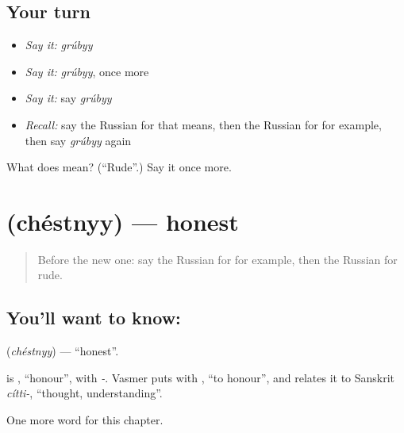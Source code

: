 \subsection*{Your turn}
\begin{itemize}
\raggedright
  \item \emph{Say it:} \emph{grúbyy}
  \item \emph{Say it:} \emph{grúbyy}, once more
  \item \emph{Say it:} say \emph{grúbyy}
  \item \emph{Recall:} say the Russian for that means, then the Russian for for example, then say \emph{grúbyy} again
\end{itemize}

\begin{tcolorbox}[breakable,colback=teal!4,colframe=teal!35!black,title={Before you move on}]
What does  mean? (\textquotedblleft{}Rude\textquotedblright{}.) Say it once more.
\end{tcolorbox}
\section[\texorpdfstring{\ru{честный} (chéstnyy)}{честный (chéstnyy)}]{ (chéstnyy) — honest}

\label{lesson:RU-C186-chestnyy}



\begin{quote}
Before the new one: say the Russian for for example, then the Russian for rude.
\end{quote}

\subsection*{You'll want to know: }
\textbf{} (\emph{chéstnyy}) — \textquotedblleft{}honest\textquotedblright{}.

\begin{cousinweb}
\textbf{} is \emph{}, \textquotedblleft{}honour\textquotedblright{}, with \emph{-}. Vasmer puts \emph{} with \emph{}, \textquotedblleft{}to honour\textquotedblright{}, and relates it to Sanskrit \emph{cítti-}, \textquotedblleft{}thought, understanding\textquotedblright{}.
\end{cousinweb}

\begin{grammarlens}[title={What you've built}]
One more word for this chapter.
\end{grammarlens}

